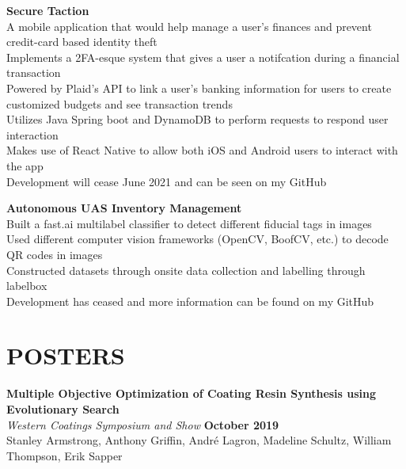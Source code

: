 \documentclass[margin,line]{resume}
\begin{document}
\begin{resume}
    \textbf{\listing Secure Taction} \vspace{2mm}\\\vspace{1mm}%
    A mobile application that would help manage a user's finances and prevent credit-card based identity theft \\
    Implements a 2FA-esque system that gives a user a notifcation during a financial transaction \\
    Powered by Plaid's API to link a user's banking information for users to create customized budgets and see transaction trends \\
    Utilizes Java Spring boot and DynamoDB to perform requests to respond user interaction \\
    Makes use of React Native to allow both iOS and Android users to interact with the app \\
    Development will cease June 2021 and can be seen on my GitHub
    
    \textbf{\listing Autonomous UAS Inventory Management} \vspace{2mm}\\\vspace{1mm}%
    Built a fast.ai multilabel classifier to detect different fiducial tags in images \\
    Used different computer vision frameworks (OpenCV, BoofCV, etc.) to decode QR codes in images \\
    Constructed datasets through onsite data collection and labelling through labelbox \\
    Development has ceased and more information can be found on my GitHub

    

\sectionline
    \section{\mysidestyle \textbf{\large{P}\small{OSTERS}}}
    \textbf{\listing Multiple Objective Optimization of Coating Resin Synthesis using\\ Evolutionary Search}\\
    \textsl{Western Coatings Symposium and Show} \hfill \textbf{October 2019}\\
    Stanley Armstrong, Anthony Griffin, Andr\'e Lagron, Madeline Schultz, William Thompson, Erik Sapper




\end{resume}
\end{document}
